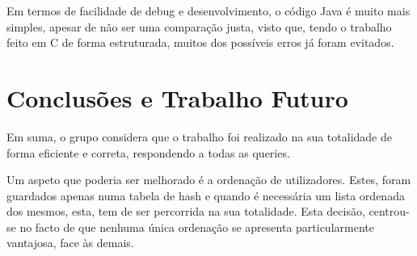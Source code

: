\documentclass[10pt,a4paper]{report}
\begin{document}
    Em termos de facilidade de debug e desenvolvimento, o código Java é muito
    mais simples, apesar de não ser uma comparação justa, visto que, tendo o
    trabalho feito em C de forma estruturada, muitos dos possíveis erros já
    foram evitados.

\chapter{Conclusões e Trabalho Futuro}
    Em suma, o grupo considera que o trabalho foi realizado na sua
    totalidade de forma eficiente e correta, respondendo a todas as queries.

    Um aspeto que poderia ser melhorado é a ordenação de utilizadores. Estes,
    foram guardados apenas numa tabela de hash e quando é necessária um lista
    ordenada dos mesmos, esta, tem de ser percorrida na sua totalidade. Esta
    decisão, centrou-se no facto de que nenhuma única ordenação se apresenta
    particularmente vantajosa, face às demais.
\end{document}
